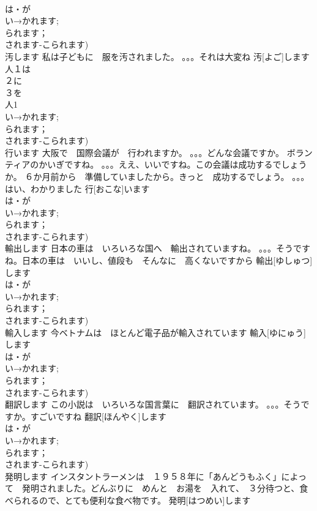 \documentclass[8pt]{extreport}
\begin{document}
\begin{CJK}{UTF8}{min}
\\	は・が
\\	い→かれます;
\\	られます；
\\	されます-こられます)
\\	汚します	私は子どもに　服を汚されました。 。。。それは大変ね	汚[よご]します				人１は　
\\	２に　
\\	３を　
\\	人1 
\\	い→かれます;
\\	られます；
\\	されます-こられます)
\\	行います	大阪で　国際会議が　行われますか。 。。。どんな会議ですか。 ボランティアのかいぎですね。 。。。ええ、いいですね。この会議は成功するでしょうか。 ６か月前から　準備していましたから。きっと　成功するでしょう。 。。。はい、わかりました	行[おこな]います			
\\	は・が
\\	い→かれます;
\\	られます；
\\	されます-こられます)
\\	輸出します	日本の車は　いろいろな国へ　輸出されていますね。 。。。そうですね。日本の車は　いいし、値段も　そんなに　高くないですから	輸出[ゆしゅつ]します			
\\	は・が
\\	い→かれます;
\\	られます；
\\	されます-こられます)
\\	輸入します	今ベトナムは　ほとんど電子品が輸入されています	輸入[ゆにゅう]します				
\\	は・が
\\	い→かれます;
\\	られます；
\\	されます-こられます)
\\	翻訳します	この小説は　いろいろな国言葉に　翻訳されています。 。。。そうですか。すごいですね	翻訳[ほんやく]します				
\\	は・が
\\	い→かれます;
\\	られます；
\\	されます-こられます)
\\	発明します	インスタントラーメンは　１９５８年に「あんどうもふく」によって　発明されました。どんぶりに　めんと　お湯を　入れて、　３分待つと、食べられるので、とても便利な食べ物です。	発明[はつめい]します				

\end{CJK}
\end{document}
